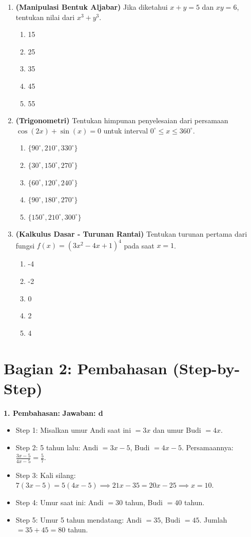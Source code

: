 \documentclass[12pt,a4paper]{article}
\begin{document}
\begin{enumerate}
    \item \textbf{(Manipulasi Bentuk Aljabar)} Jika diketahui $x + y = 5$ dan $xy = 6$, tentukan nilai dari $x^3 + y^3$.
    \begin{enumerate}[label=\alph*.]
        \item 15
        \item 25
        \item 35
        \item 45
        \item 55
    \end{enumerate}
    
    \item \textbf{(Trigonometri)} Tentukan himpunan penyelesaian dari persamaan $\cos(2x) + \sin(x) = 0$ untuk interval $0^\circ \leq x \leq 360^\circ$.
    \begin{enumerate}[label=\alph*.]
        \item $\{90^\circ, 210^\circ, 330^\circ\}$
        \item $\{30^\circ, 150^\circ, 270^\circ\}$
        \item $\{60^\circ, 120^\circ, 240^\circ\}$
        \item $\{90^\circ, 180^\circ, 270^\circ\}$
        \item $\{150^\circ, 210^\circ, 300^\circ\}$
    \end{enumerate}
    
    \item \textbf{(Kalkulus Dasar - Turunan Rantai)} Tentukan turunan pertama dari fungsi $f(x) = (3x^2 - 4x + 1)^4$ pada saat $x = 1$.
    \begin{enumerate}[label=\alph*.]
        \item -4
        \item -2
        \item 0
        \item 2
        \item 4
    \end{enumerate}
\end{enumerate}

\newpage
\section*{Bagian 2: Pembahasan (Step-by-Step)}

\textbf{1. Pembahasan:} \hfill \textbf{Jawaban: d}
\begin{itemize}
    \item Step 1: Misalkan umur Andi saat ini $= 3x$ dan umur Budi $= 4x$.
    \item Step 2: 5 tahun lalu: Andi $= 3x - 5$, Budi $= 4x - 5$. Persamaannya: $\frac{3x - 5}{4x - 5} = \frac{5}{7}$.
    \item Step 3: Kali silang: $7(3x - 5) = 5(4x - 5) \implies 21x - 35 = 20x - 25 \implies x = 10$.
    \item Step 4: Umur saat ini: Andi $= 30$ tahun, Budi $= 40$ tahun.
    \item Step 5: Umur 5 tahun mendatang: Andi $= 35$, Budi $= 45$. Jumlah $= 35 + 45 = 80$ tahun.
\end{itemize}
\end{document}
